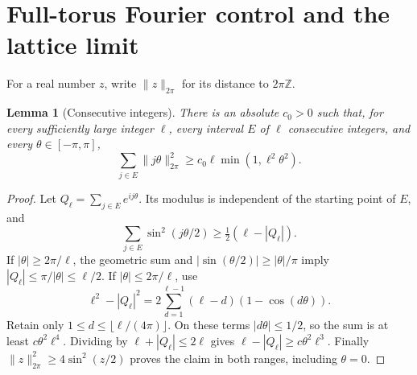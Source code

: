\documentclass[11pt,letterpaper]{article}
\numberwithin{equation}{section}
\newtheorem{lemma}[theorem]{Lemma}
\theoremstyle{definition}\newtheorem{definition}[theorem]{Definition}
\theoremstyle{remark}\newtheorem{remark}[theorem]{Remark}
\newcommand{\Z}{\mathbb Z}
\newcommand{\normtor}[1]{\lVert #1\rVert_{2\pi}}
\begin{document}
\section{Full-torus Fourier control and the lattice limit}\label{mss:sec:LLT}
For a real number $z$, write $\normtor{z}$ for its distance to $2\pi\Z$.

\begin{lemma}[Consecutive integers]\label{mss:lem:block}
There is an absolute $c_0>0$ such that, for every sufficiently large integer $\ell$, every interval $E$ of $\ell$ consecutive integers, and every $\theta\in[-\pi,\pi]$,
\begin{equation}\label{mss:eq:block}
\sum_{j\in E}\normtor{j\theta}^2
\ge c_0\ell\min(1,\ell^2\theta^2).
\end{equation}
\end{lemma}
\begin{proof}
Let $Q_\ell=\sum_{j\in E}e^{ij\theta}$. Its modulus is independent of the starting point of $E$, and
\[
\sum_{j\in E}\sin^2(j\theta/2)
\ge\tfrac12(\ell-|Q_\ell|).
\]
If $|\theta|\ge2\pi/\ell$, the geometric sum and $|\sin(\theta/2)|\ge|\theta|/\pi$ imply $|Q_\ell|\le\pi/|\theta|\le\ell/2$. If $|\theta|\le2\pi/\ell$, use
\[
\ell^2-|Q_\ell|^2
=2\sum_{d=1}^{\ell-1}(\ell-d)(1-\cos(d\theta)).
\]
Retain only $1\le d\le\lfloor\ell/(4\pi)\rfloor$. On these terms $|d\theta|\le1/2$, so the sum is at least $c\theta^2\ell^4$. Dividing by $\ell+|Q_\ell|\le2\ell$ gives $\ell-|Q_\ell|\ge c\theta^2\ell^3$. Finally $\normtor{z}^2\ge4\sin^2(z/2)$ proves the claim in both ranges, including $\theta=0$.
\end{proof}
\end{document}
